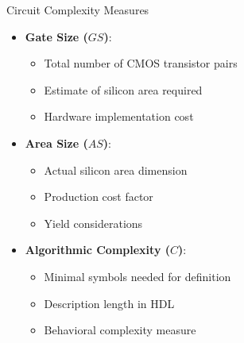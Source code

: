 \documentclass[aspectratio=169,11pt]{beamer}
\newcommand{\concept}[1]{\textbf{\color{accentcolor}#1}}
\begin{document}
\begin{frame}{Circuit Complexity Measures}
\begin{itemize}
\item \concept{Gate Size ($GS$)}:
\begin{itemize}
\item Total number of CMOS transistor pairs
\item Estimate of silicon area required
\item Hardware implementation cost
\end{itemize}
\vspace{0.3cm}
\item \concept{Area Size ($AS$)}:
\begin{itemize}
\item Actual silicon area dimension
\item Production cost factor
\item Yield considerations
\end{itemize}
\vspace{0.3cm}
\item \concept{Algorithmic Complexity ($C$)}:
\begin{itemize}
\item Minimal symbols needed for definition
\item Description length in HDL
\item Behavioral complexity measure
\end{itemize}
\end{itemize}
\end{frame}
\end{document}
